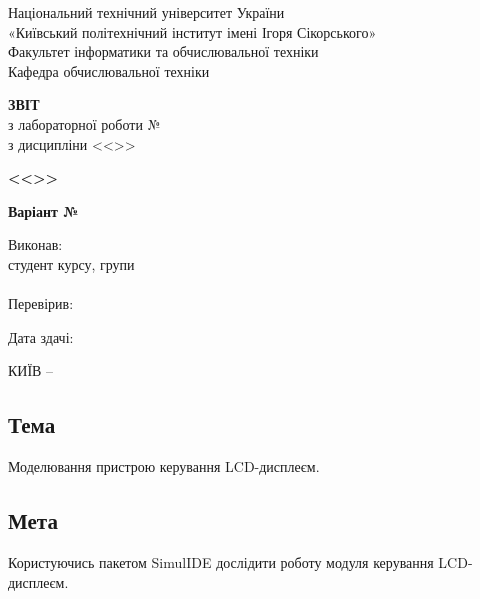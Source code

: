 \documentclass[14pt, a4paper]{extreport}
\begin{document}
	
	\begin{titlepage}
		\begin{center}
			\normalsize
			Національний технічний університет України\\
			«Київський політехнічний інститут імені Ігоря Сікорського» \\[0.5em]
			Факультет інформатики та обчислювальної техніки\\
			Кафедра обчислювальної техніки
			
			\vfill
			
			{\large \textbf{ЗВІТ}\\[0.5em]}
			{з лабораторної роботи №\LabNumber \\}
			{з дисципліни <<\CourseTitle>>}
			
			\vspace{2em}
			
			{\textbf{<<\Topic>>}}
			
			\vspace{1em}
			
			{\textbf{Варіант №\Variant}}
			
			\vfill
			
			\begin{flushright}
				Виконав: \\ студент \CourseNumber{} курсу, групи \StudentGroup \\
				\StudentName \\[1em]
				Перевірив: \\ \Teacher
			\end{flushright}
			
			\vfill
			
			\begin{flushright}
				Дата здачі: \DTMtoday
			\end{flushright}
			
			\vspace{5em}
			КИЇВ -- \ReportYear
		\end{center}
	\end{titlepage}
	
	\clearpage
	\setcounter{page}{2}
	
	\subsection*{Тема} 
	Моделювання пристрою керування LCD-дисплеєм.
	
	\subsection*{Мета} 
	Користуючись пакетом SimulIDE дослідити роботу модуля керування LCD-дисплеєм.
	
\end{document}
